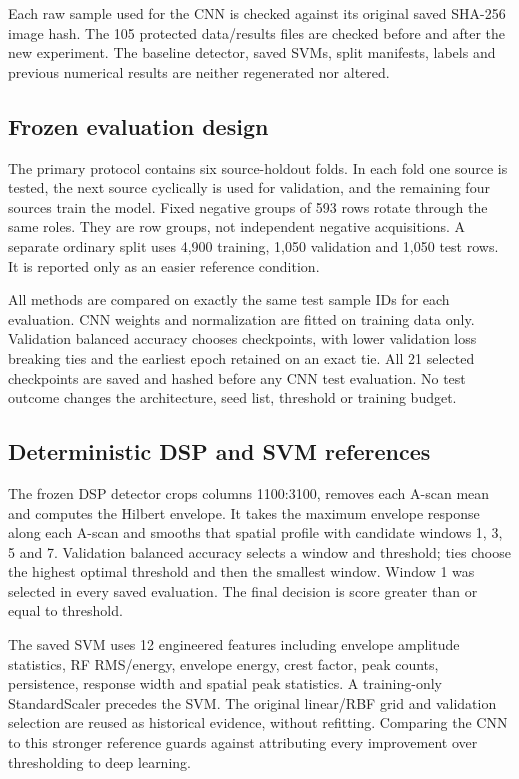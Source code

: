 \documentclass[11pt,a4paper]{article}
\begin{document}
Each raw sample used for the CNN is checked against its original saved SHA-256 image hash. The 105 protected data/results files are checked before and after the new experiment. The baseline detector, saved SVMs, split manifests, labels and previous numerical results are neither regenerated nor altered.

\subsection{Frozen evaluation design}

The primary protocol contains six source-holdout folds. In each fold one source is tested, the next source cyclically is used for validation, and the remaining four sources train the model. Fixed negative groups of 593 rows rotate through the same roles. They are row groups, not independent negative acquisitions. A separate ordinary split uses 4,900 training, 1,050 validation and 1,050 test rows. It is reported only as an easier reference condition.

All methods are compared on exactly the same test sample IDs for each evaluation. CNN weights and normalization are fitted on training data only. Validation balanced accuracy chooses checkpoints, with lower validation loss breaking ties and the earliest epoch retained on an exact tie. All 21 selected checkpoints are saved and hashed before any CNN test evaluation. No test outcome changes the architecture, seed list, threshold or training budget.

\subsection{Deterministic DSP and SVM references}

The frozen DSP detector crops columns 1100:3100, removes each A-scan mean and computes the Hilbert envelope. It takes the maximum envelope response along each A-scan and smooths that spatial profile with candidate windows 1, 3, 5 and 7. Validation balanced accuracy selects a window and threshold; ties choose the highest optimal threshold and then the smallest window. Window 1 was selected in every saved evaluation. The final decision is score greater than or equal to threshold.

The saved SVM uses 12 engineered features including envelope amplitude statistics, RF RMS/energy, envelope energy, crest factor, peak counts, persistence, response width and spatial peak statistics. A training-only StandardScaler precedes the SVM. The original linear/RBF grid and validation selection are reused as historical evidence, without refitting. Comparing the CNN to this stronger reference guards against attributing every improvement over thresholding to deep learning.
\end{document}
